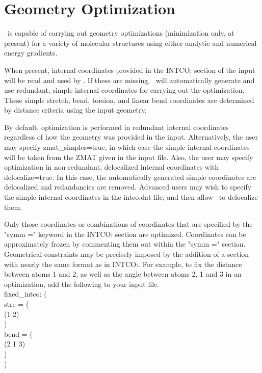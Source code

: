 \section{Geometry Optimization} \label{opt}

\PSIthree\ is capable of carrying out geometry optimizations (minimization
only, at present) for a variety of molecular structures using either analytic
and numerical energy gradients.  

When present, internal coordinates provided in the INTCO: section of the
input will be read and used by \PSIthree.  If these are missing, \PSIthree\
will automatically generate and use redundant, simple internal
coordinates for carrying out the optimization.  These simple stretch, bend,
torsion, and linear bend coordinates are determined by distance
criteria using the input geometry.

By default, optimization is performed in redundant internal coordinates
regardless of how the geometry was provided in the input.  Alternatively,
the user may specify zmat\_simples=true, in which case the simple internal
coordinates will be taken from the ZMAT given in the input file.  Also,
the user may specify optimization in non-redundant, delocalized internal coordinates
with delocalize=true.  In this case, the automatically generated simple
coordinates are delocalized and redandancies are removed.  Advanced users
may wish to specify the simple internal coordinates in the intco.dat file, and
then allow \PSIthree\ to delocalize them.

Only those coordinates or combinations of coordinates that are specified
by the "symm =" keyword in the INTCO: section are optimized.  Coordinates can
be approximately frozen by commenting them out within the "symm =" section.
Geometrical constraints may be precisely imposed by the addition of a section
with nearly the same format as in INTCO:.  For example, to fix the distance
between atoms 1 and 2, as well as the angle between atoms 2, 1 and 3
in an optimization, add the following to your input file.
\\
\noindent
fixed\_intco: ( \\
  stre = ( \\
    (1 2) \\
  ) \\
  bend = ( \\
    (2 1 3) \\
  ) \\
) \\

